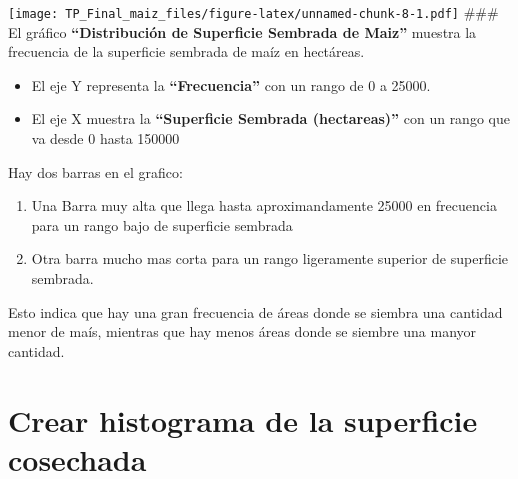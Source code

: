\documentclass[
]{article}
\newenvironment{Shaded}{\begin{snugshade}}{\end{snugshade}}
\newcommand{\AttributeTok}[1]{\textcolor[rgb]{0.13,0.29,0.53}{#1}}
\newcommand{\DecValTok}[1]{\textcolor[rgb]{0.00,0.00,0.81}{#1}}
\newcommand{\FunctionTok}[1]{\textcolor[rgb]{0.13,0.29,0.53}{\textbf{#1}}}
\newcommand{\NormalTok}[1]{#1}
\newcommand{\SpecialCharTok}[1]{\textcolor[rgb]{0.81,0.36,0.00}{\textbf{#1}}}
\newcommand{\StringTok}[1]{\textcolor[rgb]{0.31,0.60,0.02}{#1}}
\begin{document}
\texttt{[image: TP\_Final\_maiz\_files/figure-latex/unnamed-chunk-8-1.pdf]}
\#\#\# El gráfico \textbf{``Distribución de Superficie Sembrada de
Maiz''} muestra la frecuencia de la superficie sembrada de maíz en
hectáreas.

\begin{itemize}
\item
  El eje Y representa la \textbf{``Frecuencia''} con un rango de 0 a
  25000.
\item
  El eje X muestra la \textbf{``Superficie Sembrada (hectareas)''} con
  un rango que va desde 0 hasta 150000
\end{itemize}

Hay dos barras en el grafico:

\begin{enumerate}
\def\labelenumi{\arabic{enumi}.}
\item
  Una Barra muy alta que llega hasta aproximandamente 25000 en
  frecuencia para un rango bajo de superficie sembrada
\item
  Otra barra mucho mas corta para un rango ligeramente superior de
  superficie sembrada.
\end{enumerate}

Esto indica que hay una gran frecuencia de áreas donde se siembra una
cantidad menor de maís, mientras que hay menos áreas donde se siembre
una manyor cantidad.

\hypertarget{crear-histograma-de-la-superficie-cosechada}{%
\section{Crear histograma de la superficie
cosechada}\label{crear-histograma-de-la-superficie-cosechada}}

\begin{Shaded}
\end{Shaded}
\end{document}
